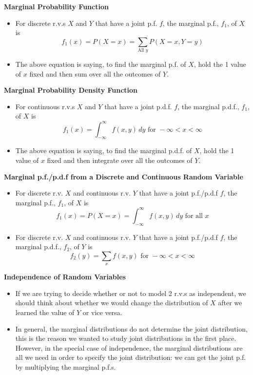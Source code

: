 \documentclass[11pt]{article}
\begin{document}
\textbf{Marginal Probability Function}
\begin{itemize}
    \item For discrete r.v.s $X$ and $Y$ that have a joint p.f. $f$, the marginal p.f., $f_1$,
    of $X$ is 
    \[ f_1(x) = P(X=x)= \sum_{\text{All } y} P(X=x, Y=y) \]
    \item The above equation is saying, to find the marginal p.f. of $X$, hold the 1 value of 
    $x$ fixed and then sum over all the outcomes of $Y$.
\end{itemize}

\textbf{Marginal Probability Density Function}
\begin{itemize}
    \item For continuous r.v.s $X$ and $Y$ that have a joint p.d.f. $f$, the marginal p.d.f., 
    $f_1$, of $X$ is 
    \[ f_1(x) = \int_{-\infty}^{\infty} f(x,y) \,dy \text{\ \ \ for } -\infty < x < \infty \]
    \item The above equation is saying, to find the marginal p.d.f. of $X$, hold the 1 value of 
    $x$ fixed and then integrate over all the outcomes of $Y$.
\end{itemize}

\textbf{Marginal p.f./p.d.f from a Discrete and Continuous Random Variable}
\begin{itemize}
    \item For discrete r.v. $X$ and continuous r.v. $Y$ that have a joint p.f./p.d.f $f$, the 
    marginal p.f., $f_1$, of $X$ is 
    \[ f_1(x) = P(X=x) = \int_{-\infty}^{\infty} f(x,y) \,dy \text{\ \ \ for all } x \]
    \item For discrete r.v. $X$ and continuous r.v. $Y$ that have a joint p.f./p.d.f $f$, the 
    marginal p.d.f., $f_2$, of $Y$ is 
    \[ f_2(y) = \sum_{x} f(x,y) \text{\ \ \ for } -\infty < x < \infty \]
\end{itemize}

\textbf{Independence of Random Variables}
\begin{itemize}
    \item If we are trying to decide whether or not to model 2 r.v.s as independent, we should
    think about whether we would change the distribution of $X$ after we learned the value of 
    $Y$ or vice versa.
    \item In general, the marginal distributions do not determine the joint distribution, this 
    is the reason we wanted to study joint distributions in the first place. However, in the 
    special case of independence, the marginal distributions are all we need in order to 
    specify the joint distribution: we can get the joint p.f. by multiplying the marginal 
    p.f.s.
\end{itemize}
\end{document}
